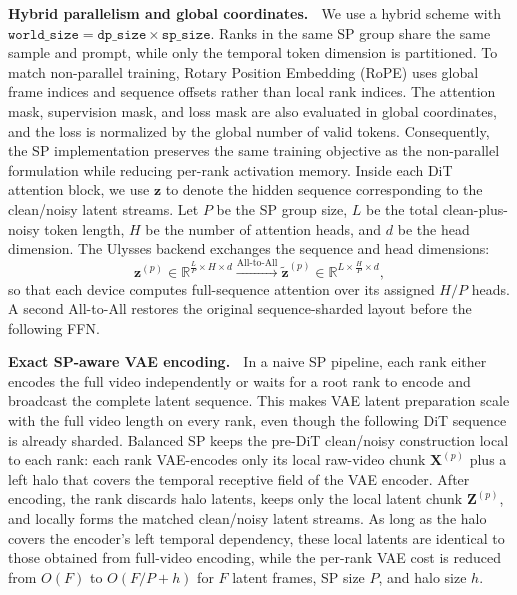 \textbf{Hybrid parallelism and global coordinates.} $\;$
We use a hybrid scheme with $\texttt{world\_size}=\texttt{dp\_size}\times\texttt{sp\_size}$.
Ranks in the same SP group share the same sample and prompt, while only the temporal token dimension is partitioned.
To match non-parallel training, Rotary Position Embedding (RoPE) uses global frame indices and sequence offsets rather than local rank indices.
The attention mask, supervision mask, and loss mask are also evaluated in global coordinates, and the loss is normalized by the global number of valid tokens.
Consequently, the SP implementation preserves the same training objective as the non-parallel formulation while reducing per-rank activation memory.
Inside each DiT attention block, we use $\mathbf{z}$ to denote the hidden sequence corresponding to the clean/noisy latent streams. Let $P$ be the SP group size, $L$ be the total clean-plus-noisy token length, $H$ be the number of attention heads, and $d$ be the head dimension. The Ulysses backend exchanges the sequence and head dimensions:
\begin{equation}
    \mathbf{z}^{(p)} \in \mathbb{R}^{\frac{L}{P} \times H \times d}
    \xrightarrow{\text{All-to-All}}
    \widetilde{\mathbf{z}}^{(p)} \in
    \mathbb{R}^{L \times \frac{H}{P} \times d},
\end{equation}
so that each device computes full-sequence attention over its assigned $H/P$ heads.
A second All-to-All restores the original sequence-sharded layout before the following FFN.

\textbf{Exact SP-aware VAE encoding.} $\;$
In a naive SP pipeline, each rank either encodes the full video independently or waits for a root rank to encode and broadcast the complete latent sequence.
This makes VAE latent preparation scale with the full video length on every rank, even though the following DiT sequence is already sharded.
Balanced SP keeps the pre-DiT clean/noisy construction local to each rank: each rank VAE-encodes only its local raw-video chunk $\mathbf{X}^{(p)}$ plus a left halo that covers the temporal receptive field of the VAE encoder.
After encoding, the rank discards halo latents, keeps only the local latent chunk $\mathbf{Z}^{(p)}$, and locally forms the matched clean/noisy latent streams.
As long as the halo covers the encoder's left temporal dependency, these local latents are identical to those obtained from full-video encoding, while the per-rank VAE cost is reduced from $O(F)$ to $O(F/P+h)$ for $F$ latent frames, SP size $P$, and halo size $h$.

